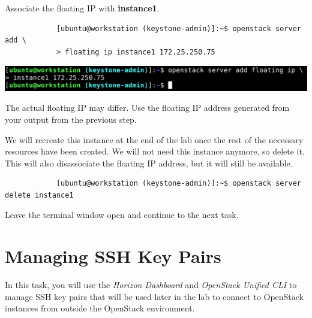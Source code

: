 \documentclass[letterpaper, 12pt]{article}
\begin{document}
\begin{enumerate}
    \begin{labstep}
        Associate the floating IP with \textbf{instance1}.
        \begin{lstlisting}
            [ubuntu@workstation (keystone-admin)]:~$ openstack server add \
            > floating ip instance1 172.25.250.75
        \end{lstlisting}

        \begin{center}
            \includegraphics[width=\linewidth]{images/part3/step12.png}
        \end{center}
    \end{labstep}

    \begin{notebox}
        The actual floating IP may differ.
        Use the floating IP address generated from your output from the previous step.
    \end{notebox}

    \begin{labstep}
        We will recreate this instance at the end of the lab once the rest of the necessary resources have been created.
        We will not need this instance anymore, so delete it.
        This will also disassociate the floating IP address, but it will still be available.
        \begin{lstlisting}
            [ubuntu@workstation (keystone-admin)]:~$ openstack server delete instance1
        \end{lstlisting}
    \end{labstep}

    \begin{labstep}
        Leave the terminal window open and continue to the next task.
    \end{labstep}

\end{enumerate}

\section{Managing SSH Key Pairs}\label{sec:managing-ssh-key-pairs}
In this task, you will use the \textit{Horizon Dashboard} and \textit{OpenStack Unified CLI} to manage SSH key pairs that will be used later in the lab to connect to OpenStack instances from outside the OpenStack environment.
\end{document}
